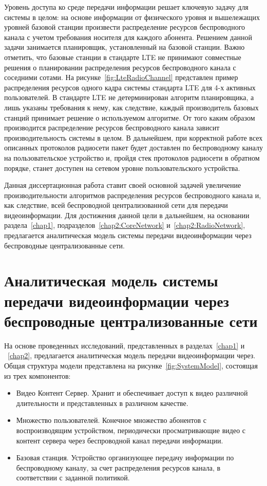 Уровень доступа ко среде передачи информации решает ключевую задачу для системы в целом: на основе информации от физического уровня и вышележащих уровней базовой станции произвести распределение ресурсов беспроводного канала с учетом требования носителя для каждого абонента. Решением данной задачи занимается планировщик, установленный на базовой станции. Важно отметить, что базовые станции в стандарте LTE не принимают совместные решения о планировании распределения ресурсов беспроводного канала с соседними сотами. На рисунке~\ref{fig:LteRadioChannel} представлен пример распределения ресурсов одного кадра системы стандарта LTE для 4-х активных пользователей. В стандарте LTE не детерминирован алгоритм планировщика, а лишь указаны требования к нему, как следствие, каждый производитель базовых станций принимает решение о используемом алгоритме. От того каким образом производится распределение ресурсов беспроводного канала зависит производительность системы в целом. В дальнейшем, при корректной работе всех описанных протоколов радиосети пакет будет доставлен по беспроводному каналу на пользовательское устройство и, пройдя стек протоколов радиосети в обратном порядке, станет доступен на сетевом уровне пользовательского устройства.

Данная диссертационная работа ставит своей основной задачей увеличение производительности алгоритмов распределения ресурсов беспроводного канала и, как следствие, всей беспроводной централизованной сети для передачи видеоинформации. Для достижения данной цели в дальнейшем, на основании раздела~\ref{chap1}, подразделов~\ref{chap2:CoreNetwork} и~\ref{chap2:RadioNetwork}, предлагается аналитическая модель системы передачи видеоинформации через беспроводные централизованные сети.

\section{Аналитическая модель системы передачи видеоинформации через беспроводные централизованные сети}
\label{chap2:AnalyticalModel}

На основе проведенных исследований, представленных в разделах~\ref{chap1} и ~\ref{chap2}, предлагается аналитическая модель передачи видеоинформации через. Общая структура модели представлена на рисунке~\ref{fig:SystemModel}, состоящая из трех компонентов:
\begin{itemize}
	\item Видео Контент Сервер. Хранит и обеспечивает доступ к видео различной длительности и представленных в различном качестве.
	\item Множество пользователей. Конечное множество абонентов с воспроизводящим устройством, периодически просматривающие видео с контент сервера через беспроводной канал передачи информации.
	\item Базовая станция. Устройство организующее передачу информации по беспроводному каналу, за счет распределения ресурсов канала, в соответствии с заданной политикой.
\end{itemize}

